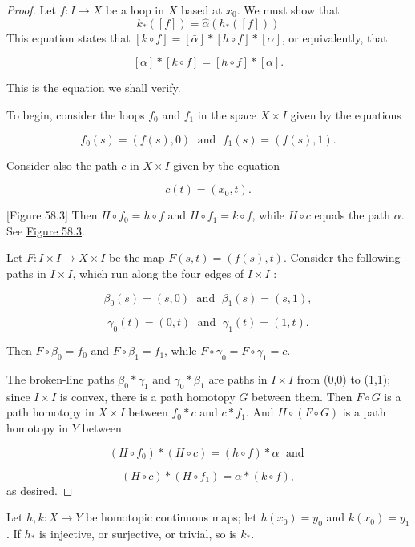 \begin{proof}
Let \(f : I \rightarrow X\) be a loop in \(X\) based at \(x_{0}\). We must show that
\[
k_{ * }( [ f] ) = \hat{\alpha }( h_{ * }( [ f] ) )
\]
This equation states that \([ {k \circ f}] = [ \bar{\alpha }] * [ {h \circ f}] * [ \alpha ]\), or equivalently, that

\[
[ \alpha ] * [ {k \circ f}] = [ {h \circ f}] * [ \alpha ] .
\]

This is the equation we shall verify.

To begin, consider the loops \(f_{0}\) and \(f_{1}\) in the space \(X \times I\) given by the equations

\[
f_{0}( s) = ( {f( s),0}) \;\text{ and }\;f_{1}( s) = ( {f( s),1}).
\]

Consider also the path \(c\) in \(X \times I\) given by the equation

\[
c( t) = ( {x_{0},t}) \text{.}
\]

[Figure 58.3]
Then \(H \circ {f}_{0} = h \circ f\) and \(H \circ {f}_{1} = k \circ f\), while \(H \circ c\) equals the path \(\alpha\). See \hyperref[fig:58.3]{Figure 58.3}.

Let \(F : I \times I \rightarrow X \times I\) be the map \(F( {s,t}) = ( {f( s),t})\). Consider the following paths in \(I \times I\), which run along the four edges of \(I \times I\) :

\[
{\beta }_{0}( s) = ( {s,0}) \;\text{ and }\;{\beta }_{1}( s) = ( {s,1}),
\]

\[
{\gamma }_{0}( t) = ( {0,t}) \;\text{ and }\;{\gamma }_{1}( t) = ( {1,t}).
\]

Then \(F \circ {\beta }_{0} = f_{0}\) and \(F \circ {\beta }_{1} = f_{1}\), while \(F \circ {\gamma }_{0} = F \circ {\gamma }_{1} = c\).

The broken-line paths \({\beta }_{0} * {\gamma }_{1}\) and \({\gamma }_{0} * {\beta }_{1}\) are paths in \(I \times I\) from (0,0) to (1,1); since \(I \times I\) is convex, there is a path homotopy \(G\) between them. Then \(F \circ G\) is a path homotopy in \(X \times I\) between \(f_{0} * c\) and \(c * f_{1}\). And \(H \circ ( {F \circ G})\) is a path homotopy in \(Y\) between

\[
( {H \circ {f}_{0}}) * ( {H \circ c}) = ( {h \circ f}) * \alpha \;\text{ and }
\]

\[
( {H \circ c}) * ( {H \circ {f}_{1}}) = \alpha * ( {k \circ f}),
\]
as desired.
\end{proof}
\begin{corollary}
\label{cor:\thetheorem}
Let \(h,k : X \rightarrow Y\) be homotopic continuous maps; let \(h( x_{0}) = y_{0}\) and \(k( x_{0}) = y_{1}\). If \(h_{ * }\) is injective, or surjective, or trivial, so is \(k_{ * }\).
\end{corollary}

